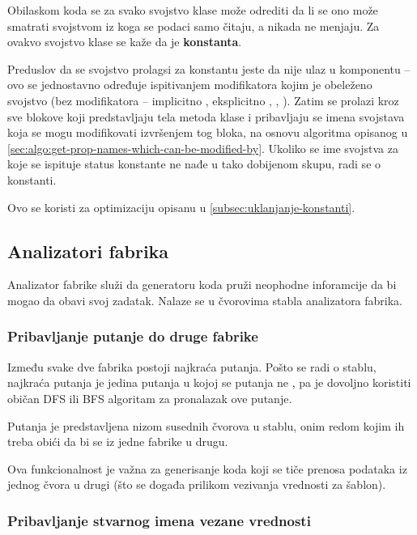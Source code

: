 Obilaskom koda se za svako svojstvo klase može odrediti da li se ono može smatrati svojstvom iz koga se podaci samo čitaju, a nikada ne menjaju.
Za ovakvo svojstvo klase se kaže da je \textbf{konstanta}.

Preduslov da se svojstvo prolagsi za konstantu jeste da nije ulaz u komponentu -- ovo se jednostavno određuje ispitivanjem modifikatora kojim je obeleženo svojstvo (bez modifikatora -- implicitno , eksplicitno , , ).
Zatim se prolazi kroz sve blokove koji predstavljaju tela metoda klase i pribavljaju se imena svojstava koja se mogu modifikovati izvršenjem tog bloka, na osnovu algoritma opisanog u \cref{sec:algo:get-prop-names-which-can-be-modified-by}.
Ukoliko se ime svojstva za koje se ispituje status konstante ne nađe u tako dobijenom skupu, radi se o konstanti.

Ovo se koristi za optimizaciju opisanu u \cref{subsec:uklanjanje-konstanti}.

\subsection{Analizatori fabrika}

Analizator fabrike služi da generatoru koda pruži neophodne inforamcije da bi mogao da obavi svoj zadatak.
Nalaze se u čvorovima stabla analizatora fabrika.

\subsubsection{Pribavljanje putanje do druge fabrike} %

Između svake dve fabrika postoji najkraća putanja.
Pošto se radi o stablu, najkraća putanja je jedina putanja u kojoj se putanja ne , pa je dovoljno koristiti običan DFS ili BFS algoritam za pronalazak ove putanje.

Putanja je predstavljena nizom susednih čvorova u stablu, onim redom kojim ih treba obići da bi se iz jedne fabrike  u drugu.

Ova funkcionalnost je važna za generisanje koda koji se tiče prenosa podataka iz jednog čvora u drugi (što se događa prilikom vezivanja vrednosti za šablon).

\subsubsection{Pribavljanje stvarnog imena vezane vrednosti} %

